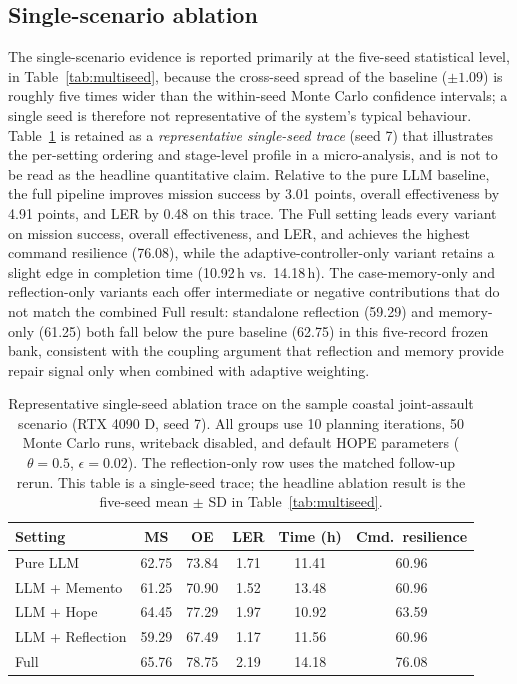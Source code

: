 \subsection{Single-scenario ablation}

The single-scenario evidence is reported primarily at the five-seed statistical level, in Table~\ref{tab:multiseed}, because the cross-seed spread of the baseline ($\pm1.09$) is roughly five times wider than the within-seed Monte Carlo confidence intervals; a single seed is therefore not representative of the system's typical behaviour. Table~\ref{tab:ablation-main} is retained as a \emph{representative single-seed trace} (seed 7) that illustrates the per-setting ordering and stage-level profile in a micro-analysis, and is not to be read as the headline quantitative claim. Relative to the pure LLM baseline, the full pipeline improves mission success by 3.01 points, overall effectiveness by 4.91 points, and LER by 0.48 on this trace. The Full setting leads every variant on mission success, overall effectiveness, and LER, and achieves the highest command resilience (76.08), while the adaptive-controller-only variant retains a slight edge in completion time (10.92\,h vs.\ 14.18\,h). The case-memory-only and reflection-only variants each offer intermediate or negative contributions that do not match the combined Full result: standalone reflection (59.29) and memory-only (61.25) both fall below the pure baseline (62.75) in this five-record frozen bank, consistent with the coupling argument that reflection and memory provide repair signal only when combined with adaptive weighting.

\begin{table}[ht]
\centering
\caption{Representative single-seed ablation trace on the sample coastal joint-assault scenario (RTX 4090 D, seed 7). All groups use 10 planning iterations, 50 Monte Carlo runs, writeback disabled, and default HOPE parameters ($\theta=0.5$, $\epsilon=0.02$). The reflection-only row uses the matched follow-up rerun. This table is a single-seed trace; the headline ablation result is the five-seed mean $\pm$ SD in Table~\ref{tab:multiseed}.}
\label{tab:ablation-main}
\small
\setlength{\tabcolsep}{3.2pt}
\begin{tabular}{lccccc}
\toprule
Setting & MS & OE & LER & Time (h) & Cmd.\ resilience \\
\midrule
Pure LLM & 62.75 & 73.84 & 1.71 & 11.41 & 60.96 \\
LLM + Memento & 61.25 & 70.90 & 1.52 & 13.48 & 60.96 \\
LLM + Hope & 64.45 & 77.29 & 1.97 & 10.92 & 63.59 \\
LLM + Reflection & 59.29 & 67.49 & 1.17 & 11.56 & 60.96 \\
Full & 65.76 & 78.75 & 2.19 & 14.18 & 76.08 \\
\bottomrule
\end{tabular}
\end{table}

